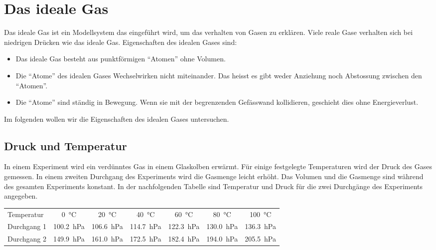\section{Das ideale Gas}
Das ideale Gas ist ein Modellsystem das eingeführt wird, um das verhalten von Gasen zu erklären.
Viele reale Gase verhalten sich bei niedrigen Drücken wie das ideale Gas.
Eigenschaften des idealen Gases sind:
\begin{itemize}
	\item Das ideale Gas besteht aus punktförmigen ``Atomen'' ohne Volumen.
	\item Die ``Atome'' des idealen Gases Wechselwirken nicht miteinander. 
		Das heisst es gibt weder Anziehung noch Abstossung zwischen den ``Atomen''.
	\item Die ``Atome'' sind ständig in Bewegung. Wenn sie mit der begrenzenden Gefässwand kollidieren, 
		geschieht dies ohne Energieverlust.
\end{itemize}

Im folgenden wollen wir die Eigenschaften des idealen Gases untersuchen.

\subsection{Druck und Temperatur}
In einem Experiment wird ein verdünntes Gas in einem Glaskolben erwärmt.
Für einige festgelegte Temperaturen wird der Druck des Gases gemessen.
In einem zweiten Durchgang des Experiments wird die Gasmenge leicht erhöht.
Das Volumen und die Gasmenge sind während des gesamten Experiments konstant.
In der nachfolgenden Tabelle sind Temperatur und Druck für die zwei Durchgänge des Experiments angegeben.

\begin{center}
\begin{tabular}{lcccccc}
Temperatur &		\SI{0}{\celsius} & \SI{20}{\celsius} & \SI{40}{\celsius} & \SI{60}{\celsius} & \SI{80}{\celsius} & \SI{100}{\celsius}\\
Durchgang 1 &  \SI{100.2}{hPa}         & \SI{106.6}{hPa}   & \SI{114.7}{hPa}   & \SI{122.3}{hPa}   & \SI{130.0}{hPa}   & \SI{136.3}{hPa}\\
Durchgang 2 &  \SI{149.9}{hPa}	     & \SI{161.0}{hPa}   & \SI{172.5}{hPa}   & \SI{182.4}{hPa}   & \SI{194.0}{hPa}   & \SI{205.5}{hPa}\\
\end{tabular}
\end{center}

